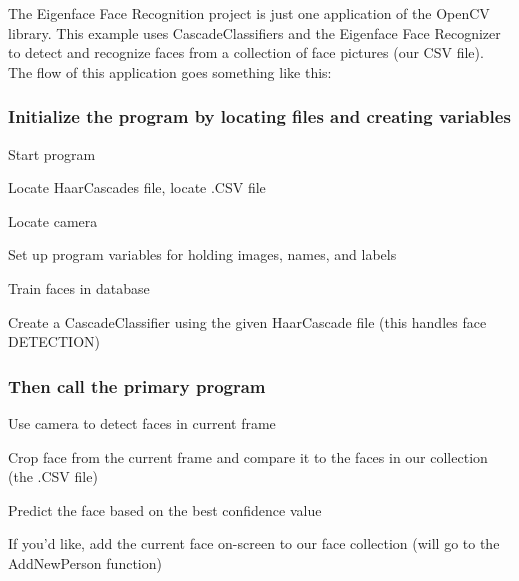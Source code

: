 The Eigenface Face Recognition project is just one application of the Open\+C\+V library. This example uses Cascade\+Classifiers and the Eigenface Face Recognizer to detect and recognize faces from a collection of face pictures (our C\+S\+V file). The flow of this application goes something like this\+:

\subsubsection*{Initialize the program by locating files and creating variables}


\begin{DoxyEnumerate}
\item Start program
\item Locate Haar\+Cascades file, locate .C\+S\+V file
\item Locate camera
\item Set up program variables for holding images, names, and labels
\item Train faces in database
\item Create a Cascade\+Classifier using the given Haar\+Cascade file (this handles face D\+E\+T\+E\+C\+T\+I\+O\+N)
\end{DoxyEnumerate}

\subsubsection*{Then call the primary program}


\begin{DoxyEnumerate}
\item Use camera to detect faces in current frame
\item Crop face from the current frame and compare it to the faces in our collection (the .C\+S\+V file)
\item Predict the face based on the best confidence value
\item If you'd like, add the current face on-\/screen to our face collection (will go to the Add\+New\+Person function)
\end{DoxyEnumerate}

